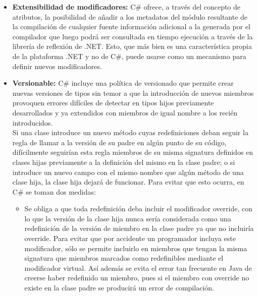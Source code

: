 \begin{itemize}
	Tambi\'en se da la posibilidad, a trav\'es del concepto de indizador, de redefinir el significado del operador para los tipos de dato definidos por el usuario, con lo que se consigue que se pueda acceder al mismo como si fuese una tabla. Esto es muy \'util para trabajar con tipos que act\'uen como colecciones de objetos. 

	\item \textbf{Extensibilidad de modificadores: } C\# ofrece, a trav\'es del concepto de atributos, la posibilidad de a\~nadir a los metadatos del m\'odulo resultante de la compilaci\'on de cualquier fuente informaci\'on adicional a la generada por el compilador que luego podr\'a ser consultada en tiempo ejecuci\'on a trav\'es de la librer\'ia de reflexi\'on de .NET. Esto, que m\'as bien es una caracter\'istica propia de la plataforma .NET y no de C\#, puede usarse como un mecanismo para definir nuevos modificadores. 

	\item \textbf{Versionable: } C\# incluye una pol\'itica de versionado que permite crear nuevas versiones de tipos sin temor a que la introducci\'on de nuevos miembros provoquen errores dif\'iciles de detectar en tipos hijos previamente desarrollados y ya extendidos con miembros de igual nombre a los reci\'en introducidos.\\

	Si una clase introduce un nuevo m\'etodo cuyas redefiniciones deban seguir la regla de llamar a la versi\'on de su padre en alg\'un punto de su c\'odigo, dif\'icilmente seguir\'ian esta regla miembros de su misma signatura definidos en clases hijas previamente a la definici\'on del mismo en la clase padre; o si introduce un nuevo campo con el mismo nombre que alg\'un m\'etodo de una clase hija, la clase hija dejar\'a de funcionar. Para evitar que esto ocurra, en C\# se toman dos medidas: 
	\begin{itemize}
		\item Se obliga a que toda redefinici\'on deba incluir el modificador override, con lo que la versi\'on de la clase hija nunca ser\'ia considerada como una redefinici\'on de la versi\'on de miembro en la clase padre ya que no incluir\'ia override. Para evitar que por accidente un programador incluya este modificador, s\'olo se permite incluirlo en miembros que tengan la misma signatura que miembros marcados como redefinibles mediante el modificador virtual. As\'i adem\'as se evita el error tan frecuente en Java de creerse haber redefinido un miembro, pues si el miembro con override no existe en la clase padre se producir\'a un error de compilaci\'on. 


\end{itemize}
\end{itemize}
